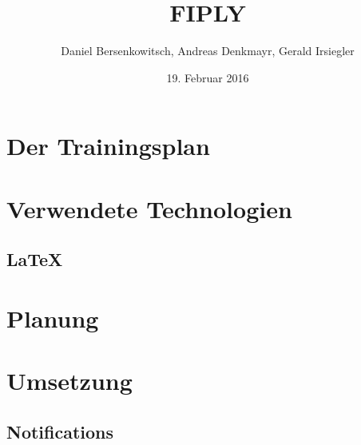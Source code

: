 \documentclass[a4paper, 12pt]{article}
\title{FIPLY}
\author{Daniel Bersenkowitsch, Andreas Denkmayr, Gerald Irsiegler}
\date{19. Februar 2016}
\begin{document}
\maketitle
\tableofcontents
\newpage


\newpage %



\newpage %
\section{Der Trainingsplan}



\newpage %
\section{Verwendete Technologien}

\newpage


\newpage
\subsection{LaTeX}







\newpage %
\section{Planung}

\newpage



\newpage %
\section{Umsetzung}

\newpage

\newpage

\newpage

\newpage

\newpage

\newpage

%
\newpage

\newpage

\newpage

\newpage

\newpage

\newpage
\subsection{Notifications}

\newpage

\end{document}
